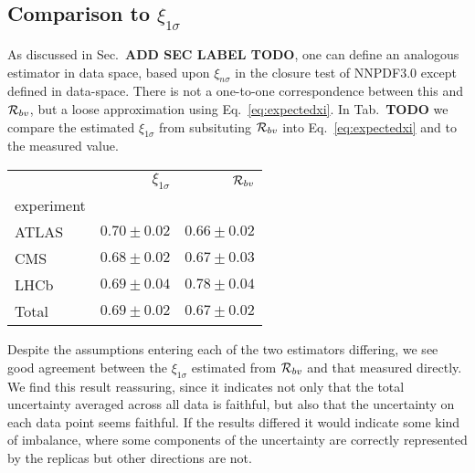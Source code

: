 \subsection{Comparison to $\xi_{1\sigma}$}

As discussed in Sec.~{\bf ADD SEC LABEL TODO}, one can define an analogous
estimator in data space, based upon $\xi_{n\sigma}$ in the closure test of
NNPDF3.0 except defined in data-space. There is not a one-to-one correspondence
between this and $\mathcal{R}_{bv}$, but a loose approximation using
Eq.~\ref{eq:expectedxi}. In Tab.~{\bf TODO} we compare the estimated
$\xi_{1\sigma}$ from
subsituting $\mathcal{R}_{bv}$ into Eq.~\ref{eq:expectedxi} and to the
measured value.

\begin{table}
    \begin{center}
        \begin{tabular}{lrr}
            \toprule
            {} &  $\xi_{1\sigma}$ &  $\mathcal{R}_{bv}$ \\
            experiment &  &                \\
            \midrule
            ATLAS       &  $0.70 \pm 0.02$ &  $0.66 \pm 0.02$ \\
            CMS         &  $0.68 \pm 0.02$ &  $0.67 \pm 0.03$ \\
            LHCb        &  $0.69 \pm 0.04$ &  $0.78 \pm 0.04$ \\
            Total       &  $0.69 \pm 0.02$ &  $0.67 \pm 0.02$ \\
            \bottomrule
        \end{tabular}
    \end{center}
\end{table}

Despite the assumptions entering each of the two estimators differing, we see
good agreement between the $\xi_{1\sigma}$ estimated from $\mathcal{R}_{bv}$
and that measured directly. We find this result reassuring, since it indicates
not only that the total uncertainty averaged across all data is faithful, but
also that the uncertainty on each data point seems faithful. If the results
differed it would indicate some kind of imbalance, where some components
of the uncertainty are correctly represented by the replicas but other directions
are not.
